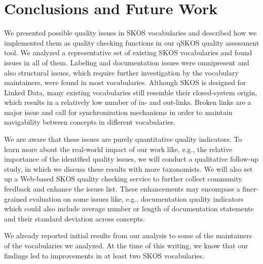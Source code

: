 \section{Conclusions and Future Work}\label{sec:conclusions}

We presented possible quality issues in SKOS vocabularies and described how we implemented them as quality checking functions in our qSKOS quality assessment tool. We analyzed a representative set of existing SKOS vocabularies and found  issues in all of them. Labeling and documentation issues were omnipresent and also structural issues, which require further investigation by the vocabulary maintainers, were found in most vocabularies. Although SKOS is designed for Linked Data, many existing vocabularies still resemble their closed-system origin, which results in a relatively low number of in- and out-links. Broken links are a major issue and call for synchronization mechanisms in order to maintain navigability between concepts in different vocabularies.

We are aware that these issues are purely quantitative quality indicators. To learn more about the real-world impact of our work like, e.g., the relative importance of the identified quality issues, we will conduct a qualitative follow-up study, in which we discuss these results with more taxonomists. We will also set up a Web-based SKOS quality checking service to further collect community feedback and enhance the issues list. These enhancements may encompass a finer-grained evaluation on some issues like, e.g., documentation quality indicators which could also include average number or length of documentation statements and their standard deviation across concepts.

We already reported initial results from our analysis to some of the maintainers of the vocabularies we analyzed. At the time of this writing, we know that our findings led to improvements in at least two SKOS vocabularies.
